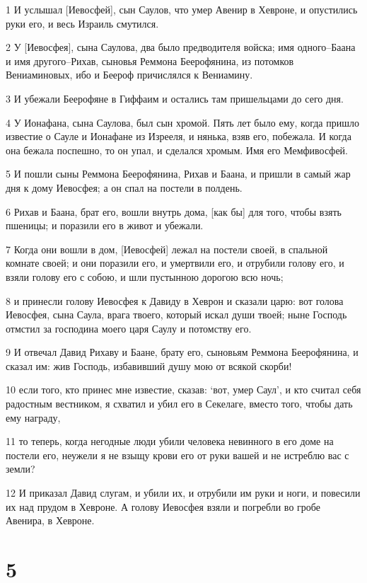 \par 1 И услышал [Иевосфей], сын Саулов, что умер Авенир в Хевроне, и опустились руки его, и весь Израиль смутился.
\par 2 У [Иевосфея], сына Саулова, два было предводителя войска; имя одного--Баана и имя другого--Рихав, сыновья Реммона Беерофянина, из потомков Вениаминовых, ибо и Беероф причислялся к Вениамину.
\par 3 И убежали Беерофяне в Гиффаим и остались там пришельцами до сего дня.
\par 4 У Ионафана, сына Саулова, был сын хромой. Пять лет было ему, когда пришло известие о Сауле и Ионафане из Изрееля, и нянька, взяв его, побежала. И когда она бежала поспешно, то он упал, и сделался хромым. Имя его Мемфивосфей.
\par 5 И пошли сыны Реммона Беерофянина, Рихав и Баана, и пришли в самый жар дня к дому Иевосфея; а он спал на постели в полдень.
\par 6 Рихав и Баана, брат его, вошли внутрь дома, [как бы] для того, чтобы взять пшеницы; и поразили его в живот и убежали.
\par 7 Когда они вошли в дом, [Иевосфей] лежал на постели своей, в спальной комнате своей; и они поразили его, и умертвили его, и отрубили голову его, и взяли голову его с собою, и шли пустынною дорогою всю ночь;
\par 8 и принесли голову Иевосфея к Давиду в Хеврон и сказали царю: вот голова Иевосфея, сына Саула, врага твоего, который искал души твоей; ныне Господь отмстил за господина моего царя Саулу и потомству его.
\par 9 И отвечал Давид Рихаву и Баане, брату его, сыновьям Реммона Беерофянина, и сказал им: жив Господь, избавивший душу мою от всякой скорби!
\par 10 если того, кто принес мне известие, сказав: `вот, умер Саул', и кто считал себя радостным вестником, я схватил и убил его в Секелаге, вместо того, чтобы дать ему награду,
\par 11 то теперь, когда негодные люди убили человека невинного в его доме на постели его, неужели я не взыщу крови его от руки вашей и не истреблю вас с земли?
\par 12 И приказал Давид слугам, и убили их, и отрубили им руки и ноги, и повесили их над прудом в Хевроне. А голову Иевосфея взяли и погребли во гробе Авенира, в Хевроне.

\chapter{5}

